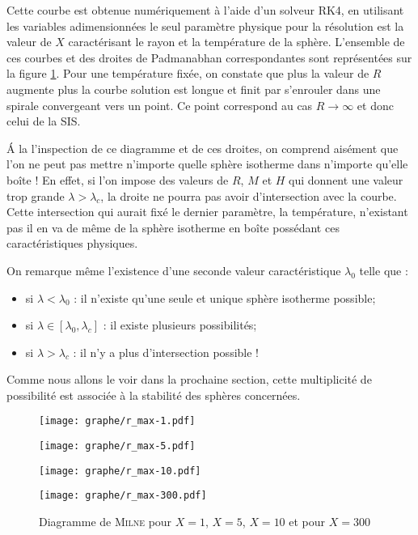	
	Cette courbe est obtenue numériquement à l'aide d'un solveur RK4, en utilisant les variables adimensionnées le seul paramètre physique pour la résolution est la valeur de $X$ caractérisant le rayon et la température de la sphère.  L'ensemble de ces courbes et des droites de Padmanabhan correspondantes sont représentées sur la figure \ref{Milne}. Pour une température fixée, on constate que plus la valeur de $R$ augmente plus la courbe solution est longue et finit par s'enrouler dans une spirale convergeant vers un point. Ce point correspond au cas $R\to\infty$ et donc celui de la SIS.
	
	\'{A} la l'inspection de ce diagramme et de ces droites, on comprend aisément que l'on ne peut pas mettre n'importe quelle sphère isotherme dans n'importe qu'elle boîte !
	En effet, si l'on impose des valeurs de $R$, $M$ et $H$ qui donnent une valeur trop grande $\lambda>\lambda_c$, la droite ne pourra pas avoir d'intersection avec la courbe. Cette intersection qui aurait fixé le dernier paramètre, la température, n'existant pas il en va de même de la sphère isotherme en boîte possédant ces caractéristiques physiques.
	
	On remarque même l'existence d'une seconde valeur caractéristique $\lambda_0$ telle que :
	\begin{itemize}
		\item si $\lambda < \lambda_0$ : il n'existe qu'une seule et unique sphère isotherme possible;
		\item si $\lambda \in \left[\lambda_0,\lambda_c\right]$ : il existe plusieurs possibilités;
		\item si $\lambda > \lambda_c$ : il n'y a plus d'intersection possible !
	\end{itemize}

Comme nous allons le voir dans la prochaine section, cette multiplicité de possibilité est associée à la stabilité des sphères concernées.

	\begin{figure}[h!]
		\begin{minipage}[b]{0.40\linewidth}
			\centering \texttt{[image: graphe/r\_max-1.pdf]}
		\end{minipage}\hfill
		\begin{minipage}[b]{0.48\linewidth}
			\centering \texttt{[image: graphe/r\_max-5.pdf]}
		\end{minipage}
		\begin{minipage}[b]{0.40\linewidth}
			\centering \texttt{[image: graphe/r\_max-10.pdf]}
		\end{minipage}\hfill
		\begin{minipage}[b]{0.48\linewidth}
			\centering \texttt{[image: graphe/r\_max-300.pdf]}
		\end{minipage}
		\caption{Diagramme de \textsc{Milne} pour $X=1$, $X=5$, $X=10$ et pour $X=300$}
		\label{Milne}
	\end{figure}